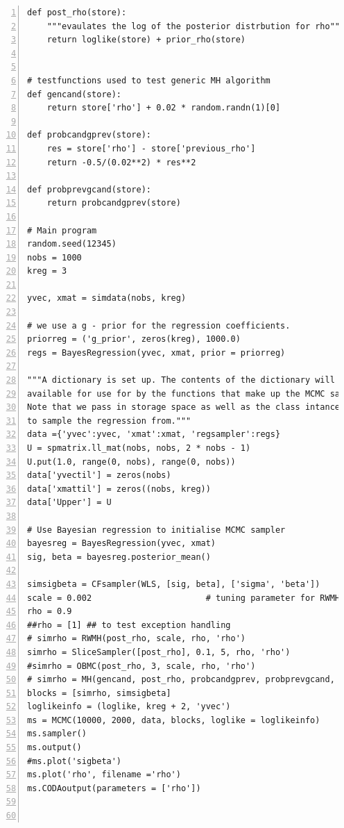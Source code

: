 \documentclass[article]{jss}
\begin{document}
\begin{lstlisting}[basicstyle={\scriptsize},numbers=left,tabsize=4]
def post_rho(store):
    """evaulates the log of the posterior distrbution for rho"""
    return loglike(store) + prior_rho(store)


# testfunctions used to test generic MH algorithm
def gencand(store):
    return store['rho'] + 0.02 * random.randn(1)[0]

def probcandgprev(store):
    res = store['rho'] - store['previous_rho']
    return -0.5/(0.02**2) * res**2

def probprevgcand(store):
    return probcandgprev(store)

# Main program
random.seed(12345)
nobs = 1000
kreg = 3

yvec, xmat = simdata(nobs, kreg)

# we use a g - prior for the regression coefficients.
priorreg = ('g_prior', zeros(kreg), 1000.0)
regs = BayesRegression(yvec, xmat, prior = priorreg)

"""A dictionary is set up. The contents of the dictionary will be
available for use for by the functions that make up the MCMC sampler.
Note that we pass in storage space as well as the class intance used
to sample the regression from."""
data ={'yvec':yvec, 'xmat':xmat, 'regsampler':regs}
U = spmatrix.ll_mat(nobs, nobs, 2 * nobs - 1)
U.put(1.0, range(0, nobs), range(0, nobs))
data['yvectil'] = zeros(nobs)
data['xmattil'] = zeros((nobs, kreg))
data['Upper'] = U

# Use Bayesian regression to initialise MCMC sampler
bayesreg = BayesRegression(yvec, xmat)
sig, beta = bayesreg.posterior_mean()

simsigbeta = CFsampler(WLS, [sig, beta], ['sigma', 'beta'])
scale = 0.002                       # tuning parameter for RWMH
rho = 0.9
##rho = [1] ## to test exception handling
# simrho = RWMH(post_rho, scale, rho, 'rho')
simrho = SliceSampler([post_rho], 0.1, 5, rho, 'rho')
#simrho = OBMC(post_rho, 3, scale, rho, 'rho')
# simrho = MH(gencand, post_rho, probcandgprev, probprevgcand, rho, 'rho')
blocks = [simrho, simsigbeta]
loglikeinfo = (loglike, kreg + 2, 'yvec')
ms = MCMC(10000, 2000, data, blocks, loglike = loglikeinfo)
ms.sampler()
ms.output()
#ms.plot('sigbeta')
ms.plot('rho', filename ='rho')
ms.CODAoutput(parameters = ['rho'])



\end{lstlisting}
\end{document}
